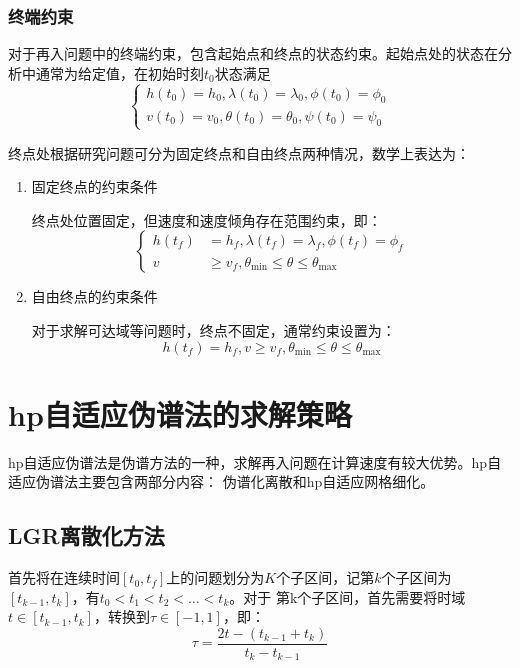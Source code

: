 \subsubsection{终端约束}
对于再入问题中的终端约束，包含起始点和终点的状态约束。起始点处的状态在分析中通常为给定值，在初始时刻$ t_0 $状态满足
\begin{equation}
	\left\{ \begin{aligned}
		h(t_0)=h_0,\lambda(t_0)=\lambda_0,\phi(t_0)=\phi_0 \\
		v(t_0)=v_0,\theta(t_0)=\theta_0,\psi(t_0)=\psi_0
	\end{aligned} \right.
\end{equation}

终点处根据研究问题可分为固定终点和自由终点两种情况，数学上表达为：
\begin{enumerate}
	\item 固定终点的约束条件\par
	      终点处位置固定，但速度和速度倾角存在范围约束，即：
	      \begin{equation}
		      \left\{ \begin{aligned}
				  h(t_f)&=h_{f}, \lambda(t_f)=\lambda_{f}, \phi(t_f)=\phi_{f} \\
				  v &\geq v_{f}, \theta_{\min } \leq \theta \leq \theta_{\max }
		      \end{aligned}\right.
	      \end{equation}
	\item 自由终点的约束条件\par
	对于求解可达域等问题时，终点不固定，通常约束设置为：
	\begin{equation}
		h(t_f)=h_{f}, v \geq v_{f}, \theta_{\min } \leq \theta \leq \theta_{\max }
	\end{equation}
\end{enumerate}

\section{hp自适应伪谱法的求解策略}
hp自适应伪谱法是伪谱方法的一种，求解再入问题在计算速度有较大优势。hp自适应伪谱法主要包含两部分内容：
伪谱化离散和hp自适应网格细化。
\subsection{LGR离散化方法}
首先将在连续时间$ [t_0,t_f] $上的问题划分为$ K $个子区间，记第$ k $个子区间为$ [t_{k-1},t_k] $，有$ t_0<t_1<t_2<\ldots<t_k $。对于
第k个子区间，首先需要将时域$ t\in[t_{k-1},t_k] $，转换到$ \tau \in [-1,1] $，即：
\begin{equation}
	\tau = \frac{2 t-\left(t_{k-1}+t_{k}\right)}{t_{k}-t_{k-1}}
\end{equation}

